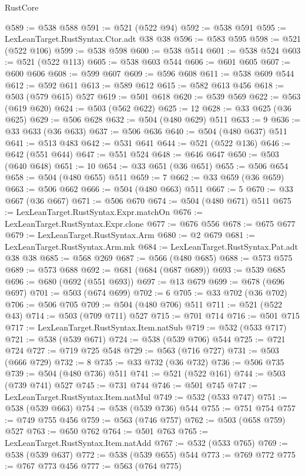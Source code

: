 \begin{lexlean}{RustCore}
\begin{coremodule}
@589 := @538 @588
@591 := @521 (@522 @94)
@592 := @538 @591
@595 := LexLeanTarget.RustSyntax.Ctor.adt @38 @38
@596 := @583 @595
@598 := @521 (@522 @106)
@599 := @538 @598
@600 := @538 @514
@601 := @538 @524
@603 := @521 (@522 @113)
@605 := @538 @603 @544
@606 := @601 @605
@607 := @600 @606
@608 := @599 @607
@609 := @596 @608
@611 := @538 @609 @544
@612 := @592 @611
@613 := @589 @612
@615 := @582 @613 @456
@618 := @503 (@579 @615) @527
@619 := @501 @618
@620 := @539 @569
@622 := @563 (@619 @620)
@624 := @503 (@562 @622)
@625 := 12
@628 := @33 @625 (@36 @625)
@629 := @506 @628
@632 := @504 (@480 @629) @511
@633 := 9
@636 := @33 @633 (@36 @633)
@637 := @506 @636
@640 := @504 (@480 @637) @511
@641 := @513 @483
@642 := @531 @641
@644 := @521 (@522 @136)
@646 := @642 (@551 @644)
@647 := @551 @524
@648 := @646 @647
@650 := @503 (@640 @648)
@651 := 10
@654 := @33 @651 (@36 @651)
@655 := @506 @654
@658 := @504 (@480 @655) @511
@659 := 7
@662 := @33 @659 (@36 @659)
@663 := @506 @662
@666 := @504 (@480 @663) @511
@667 := 5
@670 := @33 @667 (@36 @667)
@671 := @506 @670
@674 := @504 (@480 @671) @511
@675 := LexLeanTarget.RustSyntax.Expr.matchOn
@676 := LexLeanTarget.RustSyntax.Expr.clone
@677 := @676 @556
@678 := @675 @677
@679 := LexLeanTarget.RustSyntax.Arm
@680 := @2 @679
@681 := LexLeanTarget.RustSyntax.Arm.mk
@684 := LexLeanTarget.RustSyntax.Pat.adt @38 @38
@685 := @568 @269
@687 := @566 (@480 @685)
@688 := @573 @575
@689 := @573 @688
@692 := @681 (@684 (@687 @689))
@693 := @539 @685
@696 := @680 (@692 (@551 @693))
@697 := @13 @679
@699 := @678 (@696 @697)
@701 := @503 (@674 @699)
@702 := 6
@705 := @33 @702 (@36 @702)
@706 := @506 @705
@709 := @504 (@480 @706) @511
@711 := @521 (@522 @43)
@714 := @503 (@709 @711) @527
@715 := @701 @714
@716 := @501 @715
@717 := LexLeanTarget.RustSyntax.Item.natSub
@719 := @532 (@533 @717)
@721 := @538 (@539 @671)
@724 := @538 (@539 @706) @544
@725 := @721 @724
@727 := @719 @725 @548
@729 := @563 (@716 @727)
@731 := @503 (@666 @729)
@732 := 8
@735 := @33 @732 (@36 @732)
@736 := @506 @735
@739 := @504 (@480 @736) @511
@741 := @521 (@522 @161)
@744 := @503 (@739 @741) @527
@745 := @731 @744
@746 := @501 @745
@747 := LexLeanTarget.RustSyntax.Item.natMul
@749 := @532 (@533 @747)
@751 := @538 (@539 @663)
@754 := @538 (@539 @736) @544
@755 := @751 @754
@757 := @749 @755 @456
@759 := @563 (@746 @757)
@762 := @503 (@658 @759) @527
@763 := @650 @762
@764 := @501 @763
@765 := LexLeanTarget.RustSyntax.Item.natAdd
@767 := @532 (@533 @765)
@769 := @538 (@539 @637)
@772 := @538 (@539 @655) @544
@773 := @769 @772
@775 := @767 @773 @456
@777 := @563 (@764 @775)

\end{coremodule}
\end{lexlean}
